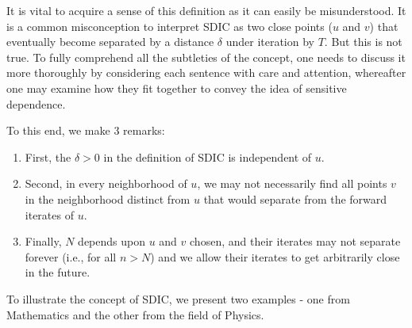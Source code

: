 \documentclass[a4paper,12pt,twoside]{report}
\begin{document}
It is vital to acquire a sense of this definition as it can easily be misunderstood. It is a common misconception to interpret SDIC as two close points ($u$ and $v$) that eventually become separated by a distance $\delta$ under iteration by $T$. But this is not true. To fully comprehend all the subtleties of the concept, one needs to discuss it more thoroughly by considering each sentence with care and attention, whereafter one may examine how they fit together to convey the idea of sensitive dependence. 

To this end, we make 3 remarks:
\vspace{-5mm}
\begin{enumerate}
  \item First, the $\delta>0$ in the definition of SDIC is independent of $u$. 
  \item Second, in every neighborhood of $u$, we may not necessarily find all points $v$ in the neighborhood distinct from $u$ that would separate from the forward iterates of $u$. 
  \item  Finally, $N$ depends upon $u$ and $v$ chosen, and their iterates may not separate forever (i.e., for all $n>N$) and we allow their iterates to get arbitrarily close in the future. 
\end{enumerate}

To illustrate the concept of SDIC, we present two examples - one from Mathematics and the other from the field of Physics.
\end{document}
